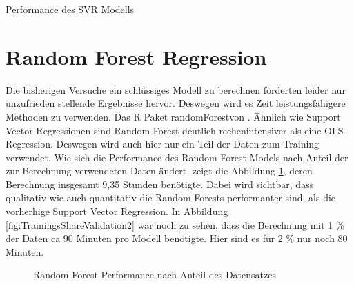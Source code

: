 \documentclass[a4paper,12pt]{thesis}
\begin{document}
\begin{table}
	\caption{Performance des SVR Modells}
	\label{tbl:SVR1}
\end{table}

\section{Random Forest Regression}\label{RF}

Die bisherigen Versuche ein schlüssiges Modell zu berechnen förderten leider nur unzufrieden stellende Ergebnisse hervor. Deswegen wird es Zeit leistungsfähigere Methoden zu verwenden. Das R Paket \glqq randomForest\grqq  von \cite{Liaw2002}. Ähnlich wie Support Vector Regressionen sind Random Forest deutlich rechenintensiver als eine OLS Regression. Deswegen wird auch hier nur ein Teil der Daten zum Training verwendet. Wie sich die Performance des Random Forest Models nach Anteil der zur Berechnung verwendeten Daten ändert, zeigt die Abbildung \ref{fig:TrainingsShareValidation1}, deren Berechnung insgesamt 9,35 Stunden benötigte. Dabei wird sichtbar, dass qualitativ wie auch quantitativ die Random Forests performanter sind, als die vorherhige Support Vector Regression. In Abbildung \ref{fig:TrainingsShareValidation2} war noch zu sehen, dass die Berechnung mit 1 \% der Daten ca 90 Minuten pro Modell benötigte. Hier sind es für 2 \% nur noch 80 Minuten.

\begin{figure}%
	\centering
	\qquad
	\caption{Random Forest Performance nach Anteil des Datensatzes}%
	\label{fig:TrainingsShareValidation1}%
\end{figure}
\end{document}

